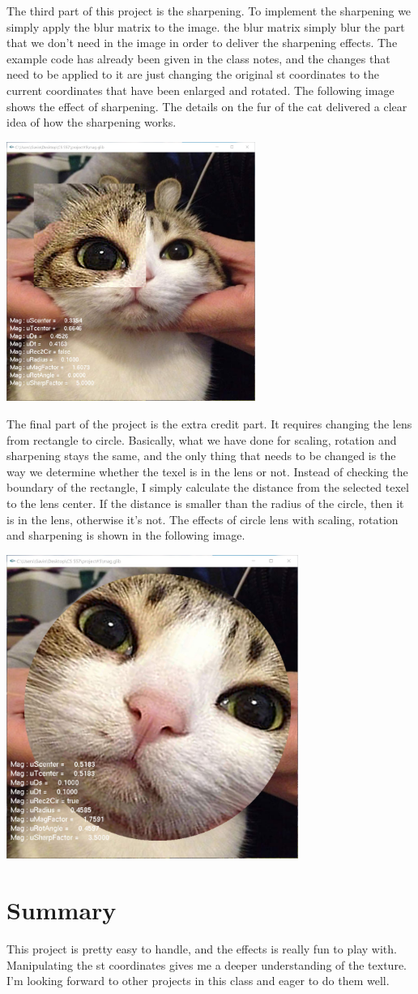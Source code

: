 \documentclass[letterpaper,14pt,titlepage,fleqn]{article}
\begin{document}
The third part of this project is the sharpening. To implement the sharpening we simply apply the blur matrix to the image. the blur matrix simply blur the part that we don't need in the image in order to deliver the sharpening effects. The example code has already been given in the class notes, and the changes that need to be applied to it are just changing the original st coordinates to the current coordinates that have been enlarged and rotated. The following image shows the effect of sharpening. The details on the fur of the cat delivered a clear idea of how the sharpening works.
\begin{center}
	\includegraphics[width=3.2in]{sharpen.jpg}
\end{center}
The final part of the project is the extra credit part. It requires changing the lens from rectangle to circle. Basically, what we have done for scaling, rotation and sharpening stays the same, and the only thing that needs to be changed is the way we determine whether the texel is in the lens or not. Instead of checking the boundary of the rectangle, I simply calculate the distance from the selected texel to the lens center. If the distance is smaller than the radius of the circle, then it is in the lens, otherwise it's not. The effects of circle lens with scaling, rotation and sharpening is shown in the following image.
\begin{center}
	\includegraphics[width=3.75in]{circle.jpg}
\end{center}
\section{Summary}
This project is pretty easy to handle, and the effects is really fun to play with. Manipulating the st coordinates gives me a deeper understanding of the texture. I'm looking forward to other projects in this class and eager to do them well.
\end{document}
